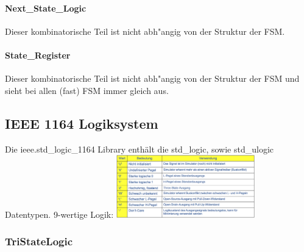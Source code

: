 \begin{multicols}{2}
	\paragraph{Next\_State\_Logic} 
	Dieser kombinatorische Teil ist nicht abh"angig von der Struktur der FSM.
	
	\vfill\null
	\columnbreak
	\paragraph{State\_Register}  
	Dieser kombinatorische Teil ist nicht abh"angig von der Struktur der 
	FSM und sieht bei allen (fast) FSM immer gleich aus.
	
\end{multicols}

\begin{multicols}{2}

	\subsection{IEEE 1164 Logiksystem}
	Die ieee.std\_logic\_1164 Library enthält die std\_logic, sowie std\_ulogic Datentypen. 9-wertige Logik:
	\includegraphics[width=0.45\textwidth]{images/ieee1164logicsystem}
	\vfill\null
	\columnbreak
	\subsubsection{TriStateLogic}
	
\end{multicols}
		
